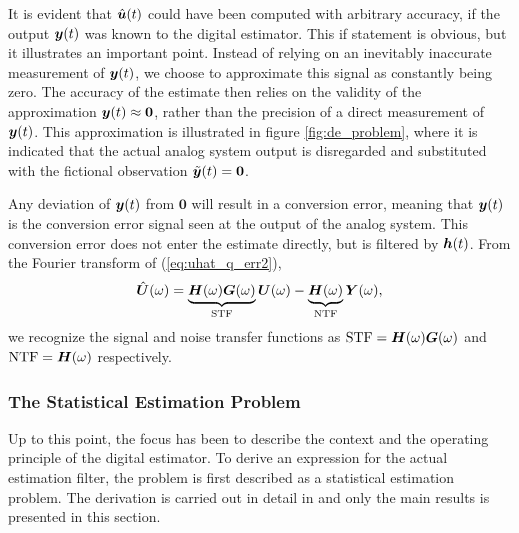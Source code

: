 It is evident that $\hat{\bm{u}}(t)$ could have been computed with arbitrary accuracy, if the output $\bm{y}(t)$ was known to the digital estimator. This if statement is obvious, but it illustrates an important point. Instead of relying on an inevitably inaccurate measurement of $\bm{y}(t)$, we choose to approximate this signal as constantly being zero. The accuracy of the estimate then relies on the validity of the approximation $\bm{y}(t) \approx \bm{0}$, rather than the precision of a direct measurement of $\bm{y}(t)$. This approximation is illustrated in figure \ref{fig:de_problem}, where it is indicated that the actual analog system output is disregarded and substituted with the fictional observation $\tilde{\bm{y}}(t) = \bm{0}$.

Any deviation of $\bm{y}(t)$ from $\bm{0}$ will result in a conversion error, meaning that $\bm{y}(t)$ is the conversion error signal seen at the output of the analog system. This conversion error does not enter the estimate directly, but is filtered by $\bm{h}(t)$. From the Fourier transform of (\ref{eq:uhat_q_err2}),
\begin{equation}
    \label{eq:F_uhat_err2}
    \hat{\bm{U}}(\omega) =  \underbrace{\bm{H}(\omega) \bm{G}(\omega)}_\text{STF}\bm{U}(\omega) - \underbrace{\bm{H}(\omega)}_\text{NTF}\bm{Y}(\omega),
\end{equation}
we recognize the signal and noise transfer functions as $\text{STF} = \bm{H}(\omega) \bm{G}(\omega)$ and $\text{NTF} = \bm{H}(\omega)$ respectively.

\subsubsection*{The Statistical Estimation Problem}
Up to this point, the focus has been to describe the context and the operating principle of the digital estimator. To derive an expression for the actual estimation filter, the problem is first described as a statistical estimation problem. The derivation is carried out in detail in \cite{malmberg_thesis} and only the main results is presented in this section.

